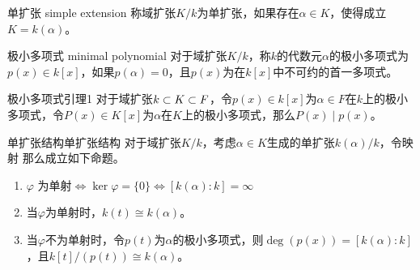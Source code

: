 \begin{definition}{单扩张 simple extension}
	称域扩张$K/k$为单扩张，如果存在$\alpha\in K$，使得成立$K=k(\alpha)$。
\end{definition}

\begin{definition}{极小多项式 minimal polynomial}
	对于域扩张$K/k$，称$k$的代数元$\alpha$的极小多项式为$p(x)\in k[x]$，如果$p(\alpha)=0$，且$p(x)$为在$k[x]$中不可约的首一多项式。
\end{definition}

\begin{lemma}{}{极小多项式引理1}
	对于域扩张$k\subset K\subset F$，令$p(x)\in k[x]$为$\alpha\in F$在$k$上的极小多项式，令$P(x)\in K[x]$为$\alpha$在$K$上的极小多项式，那么$P(x)\mid p(x)$。
\end{lemma}

\begin{theorem}{单扩张结构}{单扩张结构}
	对于域扩张$K/k$，考虑$\alpha\in K$生成的单扩张$k(\alpha)/k$，令映射
	那么成立如下命题。
	\begin{enumerate}
		\item $\varphi\text{ 为单射}\iff \ker\varphi=\{0\}\iff[k(\alpha):k]=\infty$
		\item 当$\varphi$为单射时，$k(t)\cong k(\alpha)$。
		\item 当$\varphi$不为单射时，令$p(t)$为$\alpha$的极小多项式，则$\deg(p(x))=[k(\alpha):k]$，且$k[t]/(p(t))\cong k(\alpha)$。
	\end{enumerate}
\end{theorem}


